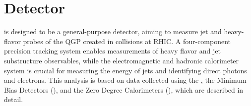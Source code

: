 \section{\sphenix Detector}
\label{sec:detector}
\sphenix is designed to be a general-purpose detector, aiming to measure jet and heavy-flavor probes of the QGP created in \auau collisions at RHIC. A four-component precision tracking system enables measurements of heavy flavor and jet substructure observables, while the electromagnetic and hadronic calorimeter system is crucial for measuring the energy of jets and identifying direct photons and electrons. 
This analysis is based on data collected using the \intt, the Minimum Bias Detectors (\mbd), and the Zero Degree Calorimeters (\zdc), which are described in detail.

